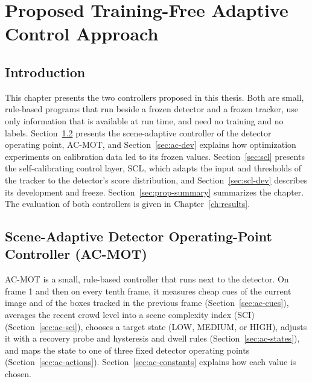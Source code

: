 \chapter{Proposed Training-Free Adaptive Control Approach}\label{ch:proposed}

\section{Introduction}\label{sec:prop-intro}
This chapter presents the two controllers proposed in this thesis. Both are small, rule-based programs that run beside a frozen detector and a frozen tracker, use only information that is available at run time, and need no training and no labels. Section~\ref{sec:acmot} presents the scene-adaptive controller of the detector operating point, AC-MOT, and Section~\ref{sec:ac-dev} explains how optimization experiments on calibration data led to its frozen values. Section~\ref{sec:scl} presents the self-calibrating control layer, SCL, which adapts the input and thresholds of the tracker to the detector's score distribution, and Section~\ref{sec:scl-dev} describes its development and freeze. Section~\ref{sec:prop-summary} summarizes the chapter. The evaluation of both controllers is given in Chapter~\ref{ch:results}.

\section{Scene-Adaptive Detector Operating-Point Controller (AC-MOT)}\label{sec:acmot}
AC-MOT is a small, rule-based controller that runs next to the detector. On frame 1 and then on every tenth frame, it measures cheap cues of the current image and of the boxes tracked in the previous frame (Section~\ref{sec:ac-cues}), averages the recent crowd level into a scene complexity index (SCI) (Section~\ref{sec:ac-sci}), chooses a target state (LOW, MEDIUM, or HIGH), adjusts it with a recovery probe and hysteresis and dwell rules (Section~\ref{sec:ac-states}), and maps the state to one of three fixed detector operating points (Section~\ref{sec:ac-actions}). Section~\ref{sec:ac-constants} explains how each value is chosen.

